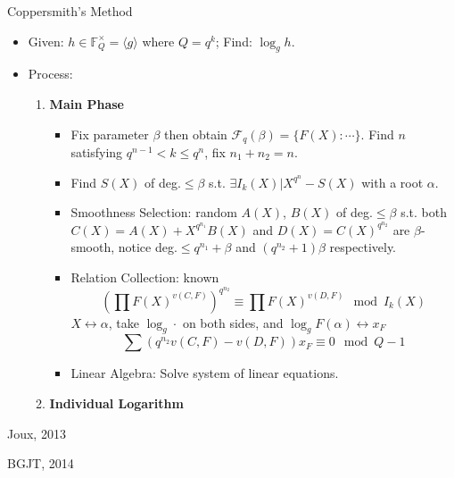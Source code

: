 \documentclass{beamer}
\begin{document}
		\begin{frame}{Coppersmith's Method}
			\begin{itemize}
				\item Given: $h \in \mathbb{F}_Q^\times = \langle g\rangle$ where $Q = q^k$; Find: $\log_g h$.
					\pause
				\item Process:
					\begin{enumerate}
						\item \textbf{Main Phase}
							\begin{itemize}
								\item<3-> Fix parameter $\beta$ then obtain $\mathcal{F}_q(\beta) = \{F(X):\cdots\}$. 
									Find $n$ satisfying $q^{n-1} < k \leq q^n$, fix $n_1 + n_2 = n$. 								
								\item<4-> Find $S(X)$ of deg.$\leq\beta$ s.t. $\exists I_k(X)|X^{q^n} - S(X)$ with a root $\alpha$.
								\item<5-> \alert{Smoothness Selection}: random $A(X)$, $B(X)$ of deg.$\leq\beta$ s.t. 
									both $C(X) = A(X) + X^{q^{n_1}}B(X)$ and $D(X) = C(X)^{q^{n_2}}$ %
									are $\beta$-smooth, notice deg.$\leq q^{n_1} + \beta$ and $(q^{n_2} + 1)\beta$ respectively.
								\item<6-> \alert{Relation Collection}: known
									$$(\prod F(X)^{v(C, F)})^{q^{n_2}} \equiv \prod F(X)^{v(D, F)} \mod I_k(X)$$
									\pause
									$X \leftrightarrow \alpha$, take $\log_g\cdot$ on both sides, and $\log_g F(\alpha)\leftrightarrow x_F$
									$$\sum(q^{n_2} v(C, F) - v(D, F)) x_F \equiv 0 \mod Q - 1$$
								\item<7-> \alert{Linear Algebra}: Solve system of linear equations.
							\end{itemize}
						\item \textbf{Individual Logarithm} \uncover<8->{Descent Method.}
					\end{enumerate}
			\end{itemize}
		\end{frame}
		
		
		\begin{frame}{Joux, 2013}
		\end{frame}
		
		\begin{frame}{BGJT, 2014}
		\end{frame}
\end{document}
